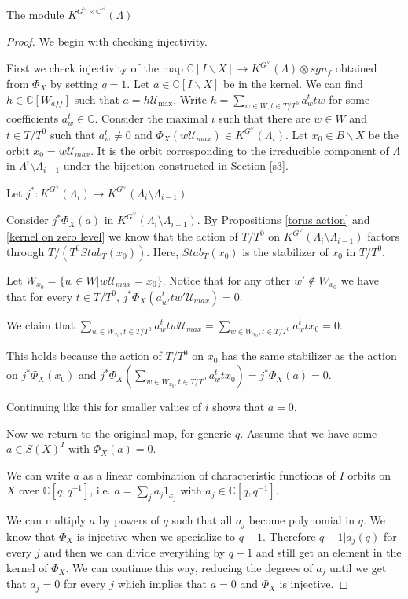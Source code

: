 \documentclass[12pt]{article}
\newcommand{\C}{\mathbb{C}}
\newcommand{\<}{\langle}
\renewcommand{\>}{\rangle}
\theoremstyle{plain}
\theoremstyle{definition}
\begin{document}
\begin{section}{The module $K^{G^\vee\times \C^\times}(\Lambda)$}
\begin{proof}
    We begin with checking injectivity. 
    
    First we check injectivity of the map $\C[I\backslash X]\rightarrow K^{G^\vee}(\Lambda)\otimes sgn_f$ obtained from $\Phi_X$ by setting $q=1$. Let $a\in \C[I\backslash X]$ be in the kernel. We can find $h\in \C[W_{aff}]$ such that $a=h\mathcal{U}_{\max}$. Write $h=\sum _{w\in W,t\in T/T^0}a_w^ttw$ for some coefficients $a_w^t\in \C$.  Consider the maximal $i$ such that there are $w\in W$ and $t\in T/T^0$ such that $a_w^t\neq 0$ and $\Phi_X(w\mathcal{U}_{max})\in K^{G^\vee}(\Lambda_i)$. Let $x_0\in B\backslash X$ be the orbit $x_0=w\mathcal{U}_{max}$. It is the orbit corresponding to the irreducible component of $\Lambda$ in $\Lambda^i\setminus\Lambda_{i-1}$ under the bijection constructed in Section \ref{s3}.

    Let $j^*:K^{G^\vee}(\Lambda_i)\rightarrow K^{G^\vee}(\Lambda_i\setminus\Lambda_{i-1})$
    
    Consider $j^*\Phi_X(a)$ in $K^{G^\vee}(\Lambda_i\setminus\Lambda_{i-1})$. By Propositions \ref{torus action} and \ref{kernel on zero level} we know that the action of $T/T^0$ on $K^{G^\vee}(\Lambda_i\setminus\Lambda_{i-1})$ factors through $T/(T^0Stab_T(x_0))$. Here, $Stab_T(x_0)$ is the stabilizer of $x_0$ in $T/T^0$. 

    Let $W_{x_0}=\{w\in W|w\mathcal{U}_{max}=x_0\}$. Notice that for any other $w'\notin W_{x_0}$ we have that for every $t\in T/T^0$, $j^*\Phi_X(a^t_{w'}tw'\mathcal{U}_{max})=0$.  

    We claim that $\sum_{w\in W_{x_0},t\in T/T^0}a_{w}^ttw\mathcal{U}_{max}=\sum_{w\in W_{x_0},t\in T/T^0}a_{w}^ttx_0=0$.
    
    This holds because the action of $T/T^0$ on $x_0$ has the same stabilizer as the action on $j^*\Phi_X(x_0)$ and $j^*\Phi_X(\sum_{w\in W_{x_0},t\in T/T^0}a_{w}^ttx_0)=j^*\Phi_X(a)=0$.
    
     Continuing like this for smaller values of $i$ shows that $a=0$.
    
    Now we return to the original map, for generic $q$. Assume that we have some $a\in S(X)^I$ with $\Phi_X(a)=0$. 
    
    We can write $a$ as a linear combination of characteristic functions of $I$ orbits on $X$ over $\C[q,q^{-1}]$, i.e. $a=\sum _j a_j1_{x_j}$ with $a_j\in \C[q,q^{-1}]$.
    
    We can multiply $a$ by powers of $q$ such that all $a_j$ become polynomial in $q$. We know that $\Phi_X$ is injective when we specialize to $q-1$. Therefore $q-1|a_j(q)$ for every $j$ and then we can divide everything by $q-1$ and still get an element in the kernel of $\Phi_X$. We can continue this way, reducing the degrees of $a_j$ until we get that $a_j=0$ for every $j$ which implies that $a=0$ and $\Phi_X$ is injective.


\end{proof}
\end{section}
\end{document}
